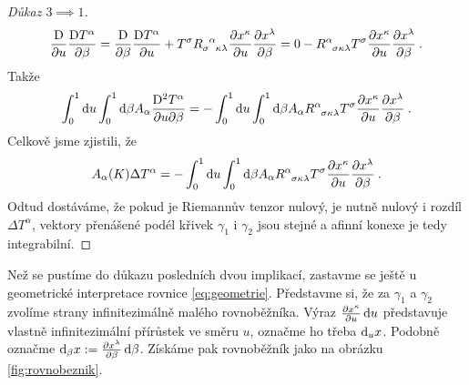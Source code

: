 \documentclass{article}
\begin{document}
\begin{proof}[Důkaz $3 \implies 1$]
    \begin{align}
        \apder{}{u}\apder{T^\alpha}{\beta} = \apder{}{\beta} \apder{T^\alpha}{u} + T^\sigma R\indices{_\sigma^\alpha_\kappa_\lambda} \pder{x^\kappa}{u} \pder{x^\lambda}{\beta} = 0 -  R\indices{^\alpha_\sigma_\kappa_\lambda} T^\sigma \pder{x^\kappa}{u} \pder{x^\lambda}{\beta} \:.
    \end{align}
    Takže 
    \begin{align}
        \int_0^1 \D u \int_0^1 \D \beta A_\alpha \frac{\mathrm{D}^2 T^\alpha}{\partial u \partial \beta} 
        = - \int_0^1 \D u \int_0^1 \D \beta A_\alpha R\indices{^\alpha_\sigma_\kappa_\lambda} T^\sigma \pder{x^\kappa}{u} \pder{x^\lambda}{\beta} \:.
    \end{align}
    Celkově jsme zjistili, že
    \begin{align}
        A_\alpha(K) \Delta T^\alpha 
        = - \int_0^1 \D u \int_0^1 \D \beta A_\alpha R\indices{^\alpha_\sigma_\kappa_\lambda} T^\sigma \pder{x^\kappa}{u} \pder{x^\lambda}{\beta} \:. \label{eq:geometrie}
    \end{align}
    Odtud dostáváme, že pokud je Riemannův tenzor nulový, je nutně nulový i rozdíl $\Delta T^\alpha$, vektory přenášené podél křivek $\gamma_1$ i $\gamma_2$ jsou stejné a afinní konexe je tedy integrabilní.

\end{proof}

Než se pustíme do důkazu posledních dvou implikací, zastavme se ještě u geometrické interpretace rovnice \eqref{eq:geometrie}. Představme si, že za $\gamma_1$ a $\gamma_2$ zvolíme strany infinitezimálně malého rovnoběžníka. Výraz $\frac{\partial x^\kappa}{\partial u} \, \mathrm{d} u$ představuje vlastně infinitezimální přírůstek ve směru $u$, označme ho třeba $\mathrm{d}_u x$. Podobně označme $\mathrm{d}_\beta x := \frac{\partial x^\lambda}{\partial \beta} \, \mathrm{d} \beta$. Získáme pak rovnoběžník jako na obrázku \vref{fig:rovnobeznik}.
\end{document}
